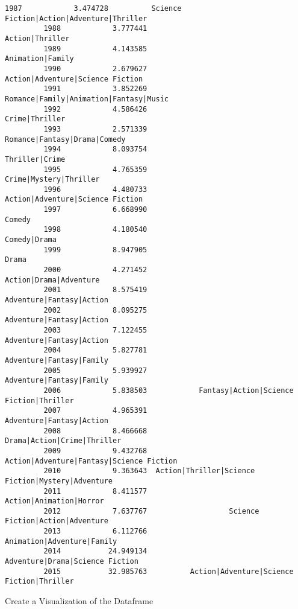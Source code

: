 \documentclass[11pt]{article}
\begin{document}
\begin{Verbatim}[commandchars=\\\{\}]
         1987            3.474728          Science Fiction|Action|Adventure|Thriller
         1988            3.777441                                    Action|Thriller
         1989            4.143585                                   Animation|Family
         1990            2.679627                   Action|Adventure|Science Fiction
         1991            3.852269             Romance|Family|Animation|Fantasy|Music
         1992            4.586426                                     Crime|Thriller
         1993            2.571339                       Romance|Fantasy|Drama|Comedy
         1994            8.093754                                     Thriller|Crime
         1995            4.765359                             Crime|Mystery|Thriller
         1996            4.480733                   Action|Adventure|Science Fiction
         1997            6.668990                                             Comedy
         1998            4.180540                                       Comedy|Drama
         1999            8.947905                                              Drama
         2000            4.271452                             Action|Drama|Adventure
         2001            8.575419                           Adventure|Fantasy|Action
         2002            8.095275                           Adventure|Fantasy|Action
         2003            7.122455                           Adventure|Fantasy|Action
         2004            5.827781                           Adventure|Fantasy|Family
         2005            5.939927                           Adventure|Fantasy|Family
         2006            5.838503            Fantasy|Action|Science Fiction|Thriller
         2007            4.965391                           Adventure|Fantasy|Action
         2008            8.466668                        Drama|Action|Crime|Thriller
         2009            9.432768           Action|Adventure|Fantasy|Science Fiction
         2010            9.363643  Action|Thriller|Science Fiction|Mystery|Adventure
         2011            8.411577                            Action|Animation|Horror
         2012            7.637767                   Science Fiction|Action|Adventure
         2013            6.112766                         Animation|Adventure|Family
         2014           24.949134                    Adventure|Drama|Science Fiction
         2015           32.985763          Action|Adventure|Science Fiction|Thriller
\end{Verbatim}
            
    Create a Visualization of the Dataframe
\end{document}
